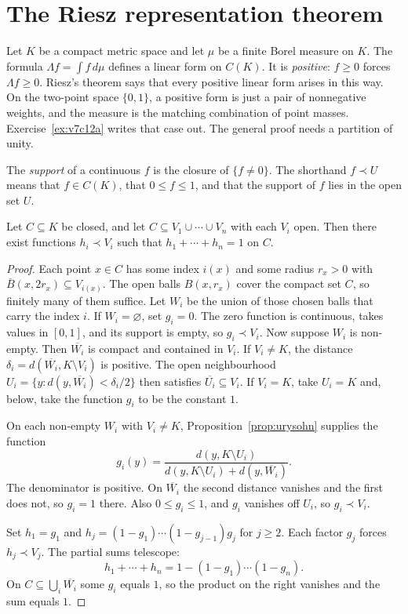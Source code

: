 \section{The Riesz representation theorem}

Let $K$ be a compact metric space and let $\mu$ be a finite Borel measure on $K$. The formula $\Lambda f=\int f\,d\mu$ defines a linear form
on $C(K)$. It is \emph{positive}: $f\ge 0$ forces $\Lambda f\ge 0$. Riesz's theorem says that every positive linear form arises in this way.
On the two-point space $\{0,1\}$, a positive form is just a pair of nonnegative weights, and the measure is the matching combination of
point masses. Exercise~\ref{ex:v7c12a} writes that case out. The general proof needs a partition of unity.

The \emph{support} of a continuous $f$ is the closure of $\{f\ne 0\}$. The shorthand $f\prec U$ means that $f\in C(K)$, that $0\le f\le 1$, and
that the support of $f$ lies in the open set $U$.

\begin{lemma}\label{lem:pou}
Let $C\subseteq K$ be closed, and let $C\subseteq V_1\cup\cdots\cup V_n$ with each $V_i$ open. Then there exist functions $h_i\prec V_i$ such that
$h_1+\cdots+h_n=1$ on $C$.
\end{lemma}
\begin{proof}
Each point $x\in C$ has some index $i(x)$ and some radius $r_x>0$ with $\overline B(x,2r_x)\subseteq V_{i(x)}$. The open balls $B(x,r_x)$ cover the
compact set $C$, so finitely many of them suffice. Let $W_i$ be the union of those chosen balls that carry the index $i$. If $W_i=\varnothing$, set $g_i=0$. The zero function is continuous, takes values in $[0,1]$, and its support is empty, so $g_i\prec V_i$. Now suppose $W_i$ is non-empty. Then
$\overline{W_i}$ is compact and contained in $V_i$. If $V_i\ne K$, the distance $\delta_i=d(\overline{W_i},K\setminus V_i)$ is positive. The open
neighbourhood $U_i=\{y:d(y,\overline{W_i})<\delta_i/2\}$ then satisfies $\overline{U_i}\subseteq V_i$. If $V_i=K$, take $U_i=K$ and, below, take the
function $g_i$ to be the constant $1$.

On each non-empty $W_i$ with $V_i\ne K$, Proposition~\ref{prop:urysohn} supplies the function
\[g_i(y)=\frac{d(y,K\setminus U_i)}{d(y,K\setminus U_i)+d(y,\overline{W_i})}.\]
The denominator is positive. On $\overline{W_i}$ the second distance vanishes and the first does not, so $g_i=1$ there. Also $0\le g_i\le 1$,
and $g_i$ vanishes off $U_i$, so $g_i\prec V_i$.

Set $h_1=g_1$ and $h_j=(1-g_1)\cdots(1-g_{j-1})g_j$ for $j\ge 2$. Each factor $g_j$ forces $h_j\prec V_j$. The partial sums telescope:
\[h_1+\cdots+h_n=1-(1-g_1)\cdots(1-g_n).\]
On $C\subseteq\bigcup_i\overline{W_i}$ some $g_i$ equals $1$, so the product on the right vanishes and the sum equals $1$.
\end{proof}

